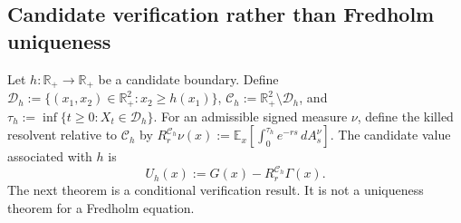 \documentclass[pdflatex,sn-mathphys-num]{sn-jnl}
\theoremstyle{plain}
\theoremstyle{definition}
\newcommand{\R}{\mathbb{R}}
\begin{document}
\subsection{Candidate verification rather than Fredholm uniqueness}
\label{sec:candidate-verification}
Let $h:\R_+\to\R_+$ be a candidate boundary. Define
$   \mathcal D_h:=\{(x_1,x_2)\in\R^2_+:x_2\ge h(x_1)\}$,
$   \mathcal C_h:=\R^2_+\setminus\mathcal D_h$,
and
$   \tau_h:=\inf\{t\ge0:X_t\in\mathcal D_h\}$.
For an admissible signed measure $\nu$, define the killed resolvent relative to
$\mathcal C_h$ by
$\displaystyle    R_r^{\mathcal C_h}\nu(x)
   :=
   \mathbb E_x\left[
      \int_0^{\tau_h}e^{-rs}\,dA_s^\nu
   \right]$.
The candidate value associated with $h$ is
\begin{equation}
\label{eq:Uh-def}
   U_h(x):=G(x)-R_r^{\mathcal C_h}\Gamma(x).
\end{equation}
The next theorem is a conditional verification result. It is not a uniqueness
theorem for a Fredholm equation.
\end{document}
